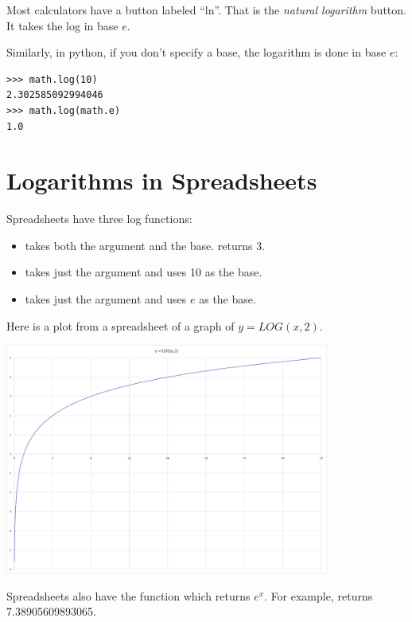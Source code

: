 Most calculators have a button labeled ``ln''. That is the
\textit{natural logarithm} button. It takes the log in base $e$.

Similarly, in python, if you don't specify a base, the logarithm is done in base $e$:

\begin{Verbatim}
>>> math.log(10)
2.302585092994046
>>> math.log(math.e)
1.0
\end{Verbatim}

\section{Logarithms in Spreadsheets}

Spreadsheets have three log functions:
\begin{itemize}
\item {} takes both the argument and the base.  returns 3.
\item {} takes just the argument and uses 10 as the base.
\item {} takes just the argument and uses $e$ as the base.
\end{itemize}

Here is a plot from a spreadsheet of a graph of $y = LOG(x, 2)$.

\includegraphics[width=0.8\textwidth]{log_graph.png}

Spreadsheets also have the function  which returns
$e^x$.  For example,  returns 7.38905609893065.

